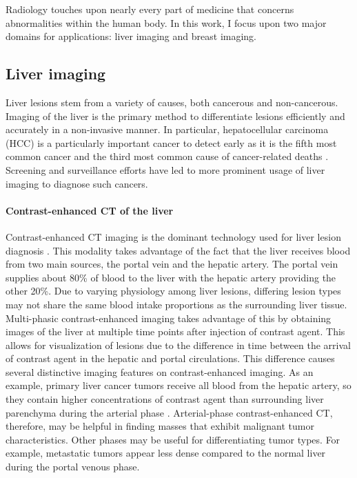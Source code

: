 Radiology touches upon nearly every part of medicine that concerns abnormalities within the human body. In this work, I focus upon two major domains for applications: liver imaging and breast imaging.

\subsection{Liver imaging}
Liver lesions stem from a variety of causes, both cancerous and non-cancerous. Imaging of the liver is the primary method to differentiate lesions efficiently and accurately in a non-invasive manner. In particular, hepatocellular carcinoma (HCC) is a particularly important cancer to detect early as it is the fifth most common cancer and the third most common cause of cancer-related deaths \cite{Willatt:2008gs}. Screening and surveillance efforts have led to more prominent usage of liver imaging to diagnose such cancers.

\paragraph{Contrast-enhanced CT of the liver}
Contrast-enhanced CT imaging is the dominant technology used for liver lesion diagnosis \cite{Baron:1994vg}. This modality takes advantage of the fact that the liver receives blood from two main sources, the portal vein and the hepatic artery. The portal vein supplies about 80\% of blood to the liver with the hepatic artery providing the other 20\%. Due to varying physiology among liver lesions, differing lesion types may not share the same blood intake proportions as the surrounding liver tissue. Multi-phasic contrast-enhanced imaging takes advantage of this by obtaining images of the liver at multiple time points after injection of contrast agent. This allows for visualization of lesions due to the difference in time between the arrival of contrast agent in the hepatic and portal circulations. This difference causes several distinctive imaging features on contrast-enhanced imaging. As an example, primary liver cancer tumors receive all blood from the hepatic artery, so they contain higher concentrations of contrast agent than surrounding liver parenchyma during the arterial phase \cite{Lautt:1987wma,Matsui:1991vba}. Arterial-phase contrast-enhanced CT, therefore, may be helpful in finding masses that exhibit malignant tumor characteristics. Other phases may be useful for differentiating tumor types. For example, metastatic tumors appear less dense compared to the normal liver during the portal venous phase.

